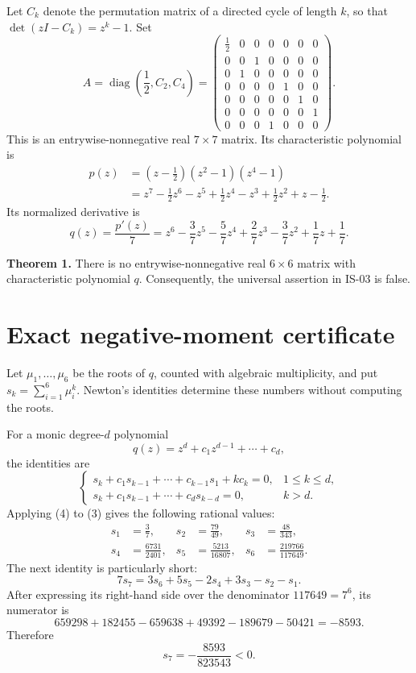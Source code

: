 \documentclass[10pt,a4paper]{article}
\begin{document}
Let \(C_k\) denote the permutation matrix of a directed cycle of length
\(k\), so that \(\det(zI-C_k)=z^k-1\). Set \[
 A=\operatorname{diag}\left(\frac12,C_2,C_4\right)
 =\begin{pmatrix}
 \frac12&0&0&0&0&0&0\\
 0&0&1&0&0&0&0\\
 0&1&0&0&0&0&0\\
 0&0&0&0&1&0&0\\
 0&0&0&0&0&1&0\\
 0&0&0&0&0&0&1\\
 0&0&0&1&0&0&0
 \end{pmatrix}.
 \tag{1}
\] This is an entrywise-nonnegative real \(7\times7\) matrix. Its
characteristic polynomial is \[
 \begin{aligned}
 p(z)&=(z-\tfrac12)(z^2-1)(z^4-1)\\
 &=z^7-\tfrac12z^6-z^5+\tfrac12z^4-z^3+\tfrac12z^2+z-\tfrac12.
 \end{aligned}
 \tag{2}
\] Its normalized derivative is \[
 q(z)=\frac{p'(z)}7
 =z^6-\frac37z^5-\frac57z^4+\frac27z^3
       -\frac37z^2+\frac17z+\frac17.
 \tag{3}
\]

\textbf{Theorem 1.} There is no entrywise-nonnegative real \(6\times6\)
matrix with characteristic polynomial \(q\). Consequently, the universal
assertion in IS-03 is false.

\section{Exact negative-moment
certificate}\label{exact-negative-moment-certificate}

Let \(\mu_1,\ldots,\mu_6\) be the roots of \(q\), counted with algebraic
multiplicity, and put \(s_k=\sum_{i=1}^6\mu_i^k\). Newton's identities
determine these numbers without computing the roots.

For a monic degree-\(d\) polynomial \[
 q(z)=z^d+c_1z^{d-1}+\cdots+c_d,
\] the identities are \[
 \begin{cases}
 s_k+c_1s_{k-1}+\cdots+c_{k-1}s_1+kc_k=0,&1\le k\le d,\\
 s_k+c_1s_{k-1}+\cdots+c_ds_{k-d}=0,&k>d.
 \end{cases}
 \tag{4}
\] Applying (4) to (3) gives the following rational values: \[
 \begin{aligned}
 s_1&=\frac37,&s_2&=\frac{79}{49},&s_3&=\frac{48}{343},\\
 s_4&=\frac{6731}{2401},&s_5&=\frac{5213}{16807},&
 s_6&=\frac{219766}{117649}.
 \end{aligned}
 \tag{5}
\] The next identity is particularly short: \[
 7s_7=3s_6+5s_5-2s_4+3s_3-s_2-s_1.
 \tag{6}
\] After expressing its right-hand side over the denominator
\(117649=7^6\), its numerator is \[
 659298+182455-659638+49392-189679-50421=-8593.
\] Therefore \[
 \boxed{s_7=-\frac{8593}{823543}<0.}
 \tag{7}
\]
\end{document}
